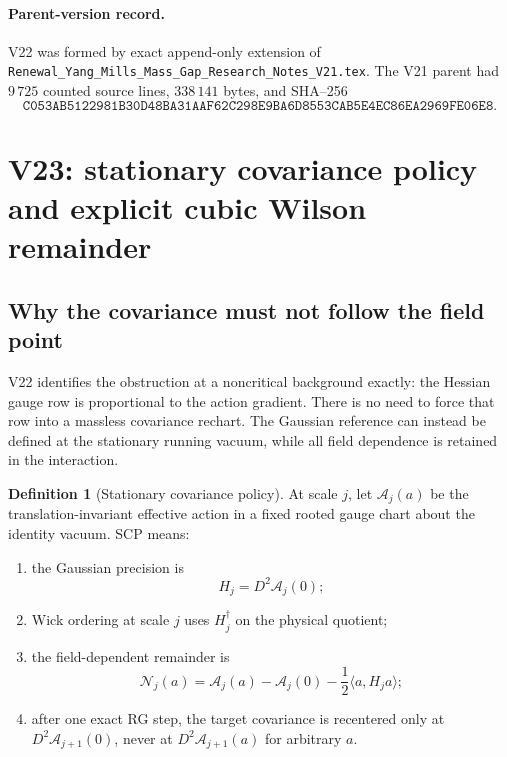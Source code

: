 \documentclass[11pt,oneside]{book}
\theoremstyle{definition}
\newtheorem{definition}[theorem]{Definition}
\theoremstyle{remark}
\begin{document}
\paragraph{Parent-version record.}
V22 was formed by exact append-only extension of
\texttt{Renewal\_Yang\_Mills\_Mass\_Gap\_Research\_Notes\_V21.tex}.
The V21 parent had \(9\,725\) counted source lines,
\(338\,141\) bytes, and SHA--256
\[
\texttt{C053AB5122981B30D48BA31AAF62C298E9BA6D8553CAB5E4EC86EA2969FE06E8}.
\]



\section{V23: stationary covariance policy and explicit cubic Wilson
remainder}
\label{sec:e8v23}

\subsection{Why the covariance must not follow the field point}

V22 identifies the obstruction at a noncritical background exactly:
the Hessian gauge row is proportional to the action gradient.  There
is no need to force that row into a massless covariance rechart.
The Gaussian reference can instead be defined at the stationary
running vacuum, while all field dependence is retained in the
interaction.

\begin{definition}[Stationary covariance policy]
\label{def:e8v23-scp}
At scale \(j\), let \(\mathcal A_j(a)\) be the translation-invariant
effective action in a fixed rooted gauge chart about the identity
vacuum.  SCP means:
\begin{enumerate}
\item the Gaussian precision is
\[
                         H_j=D^2\mathcal A_j(0);                    \tag{23.1}
\]
\item Wick ordering at scale \(j\) uses \(H_j^\dagger\) on the
physical quotient;
\item the field-dependent remainder is
\[
\mathcal N_j(a)=\mathcal A_j(a)-\mathcal A_j(0)
 -\frac12\langle a,H_ja\rangle;                                   \tag{23.2}
\]
\item after one exact RG step, the target covariance is recentered
only at \(D^2\mathcal A_{j+1}(0)\), never at
\(D^2\mathcal A_{j+1}(a)\) for arbitrary \(a\).
\end{enumerate}
\end{definition}
\end{document}

